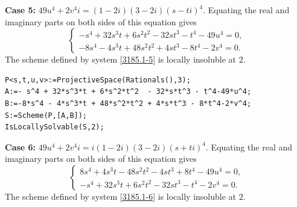 \documentclass[a4paper,12pt,english,reqno]{amsart}
\begin{document}
{\bf Case 5:} $49u^4+2v^4i=(1-2i)(3-2i)(s-ti)^4$. Equating the real and imaginary parts on both sides of this equation gives
\begin{equation}\label{3185.1-5}
\begin{cases}
-s^4 + 32s^3t + 6s^2t^2 - 32st^3 - t^4 - 49u^4=0,\\
-8s^4 - 4s^3t + 48s^2t^2 + 4st^3 - 8t^4 - 2v^4=0.
\end{cases}
\end{equation}
The scheme defined by system \eqref{3185.1-5} is locally insoluble at $2$.

%
\begin{lstlisting}
P<s,t,u,v>:=ProjectiveSpace(Rationals(),3);
A:=- s^4 + 32*s^3*t + 6*s^2*t^2  - 32*s*t^3 - t^4-49*u^4;
B:=-8*s^4 - 4*s^3*t + 48*s^2*t^2 + 4*s*t^3 - 8*t^4-2*v^4;
S:=Scheme(P,[A,B]);
IsLocallySolvable(S,2);
\end{lstlisting}

{\bf Case 6:} $49u^4+2v^4i=i(1-2i)(3-2i)(s+ti)^4$. Equating the real and imaginary parts on both sides of this equation gives
\begin{equation}\label{3185.1-6}
\begin{cases}
8s^4 + 4s^3t - 48s^2t^2 - 4st^3 + 8t^4 - 49u^4=0,\\
-s^4 + 32s^3t + 6s^2t^2 - 32st^3 - t^4 - 2v^4=0.
\end{cases}
\end{equation}
The scheme defined by system \eqref{3185.1-6} is locally insoluble at $2$.

\end{document}
